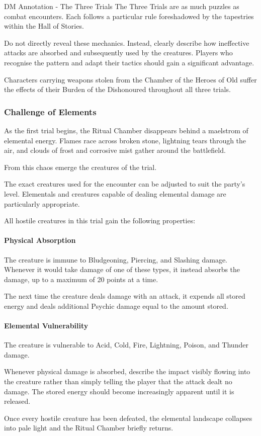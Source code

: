\begingroup
	\DndSetThemeColor[PhbTan]
	\begin{DndComment}{DM Annotation - The Three Trials}
		The Three Trials are as much puzzles as combat encounters. Each follows a particular rule foreshadowed by the tapestries within the Hall of Stories.

Do not directly reveal these mechanics. Instead, clearly describe how ineffective attacks are absorbed and subsequently used by the creatures. Players who recognise the pattern and adapt their tactics should gain a significant advantage.

Characters carrying weapons stolen from the Chamber of the Heroes of Old suffer the effects of their Burden of the Dishonoured throughout all three trials.
	\end{DndComment}
\endgroup

\subsubsection*{Challenge of Elements}
{\entryfont As the first trial begins, the Ritual Chamber disappears behind a maelstrom of elemental energy. Flames race across broken stone, lightning tears through the air, and clouds of frost and corrosive mist gather around the battlefield.

From this chaos emerge the creatures of the trial.

The exact creatures used for the encounter can be adjusted to suit the party's level. Elementals and creatures capable of dealing elemental damage are particularly appropriate.

All hostile creatures in this trial gain the following properties:

\paragraph*{Physical Absorption} The creature is immune to Bludgeoning, Piercing, and Slashing damage. Whenever it would take damage of one of these types, it instead absorbs the damage, up to a maximum of 20 points at a time.

The next time the creature deals damage with an attack, it expends all stored energy and deals additional Psychic damage equal to the amount stored.

\paragraph*{Elemental Vulnerability} The creature is vulnerable to Acid, Cold, Fire, Lightning, Poison, and Thunder damage.

Whenever physical damage is absorbed, describe the impact visibly flowing into the creature rather than simply telling the player that the attack dealt no damage. The stored energy should become increasingly apparent until it is released.

Once every hostile creature has been defeated, the elemental landscape collapses into pale light and the Ritual Chamber briefly returns.}

